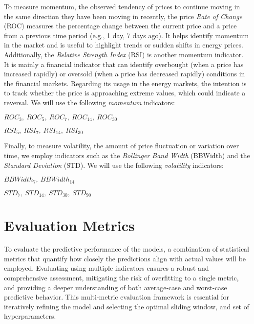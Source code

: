 \documentclass[12pt]{report} %
\begin{document}
To measure momentum, the observed tendency of prices to continue moving in the same direction they have been moving in recently, the price \textit{Rate of Change} (ROC) measures the percentage change between the current price and a price from a previous time period (e.g., 1 day, 7 days ago). It helps identify momentum in the market and is useful to highlight trends or sudden shifts in energy prices. Additionally, the \textit{Relative Strength Index} (RSI) is another momentum indicator. It is mainly a financial indicator that can identify overbought (when a price has increased rapidly) or oversold (when a price has decreased rapidly) conditions in the financial markets. Regarding its usage in the energy markets, the intention is to track whether the price is approaching extreme values, which could indicate a reversal. We will use the following \textit{momentum} indicators:

    $ ROC_{3},\ ROC_{5},\ ROC_{7},\ ROC_{14},\ ROC_{30} $
    
    $ RSI_{5},\ RSI_{7},\ RSI_{14},\ RSI_{30} $

Finally, to measure volatility, the amount of price fluctuation or variation over time, we employ indicators such as the \textit{Bollinger Band Width} (BBWidth) and the \textit{Standard Deviation} (STD). We will use the following \textit{volatility} indicators:

    $ BBWidth_{7},\ BBWidth_{14} $
    
    $ STD_{7},\ STD_{14},\ STD_{30},\ STD_{90} $


\section{Evaluation Metrics}

To evaluate the predictive performance of the models, a combination of statistical metrics that quantify how closely the predictions align with actual values will be employed. Evaluating using multiple indicators ensures a robust and comprehensive assessment, mitigating the risk of overfitting to a single metric, and providing a deeper understanding of both average-case and worst-case predictive behavior. This multi-metric evaluation framework is essential for iteratively refining the model and selecting the optimal sliding window, and set of hyperparameters.
\end{document}
